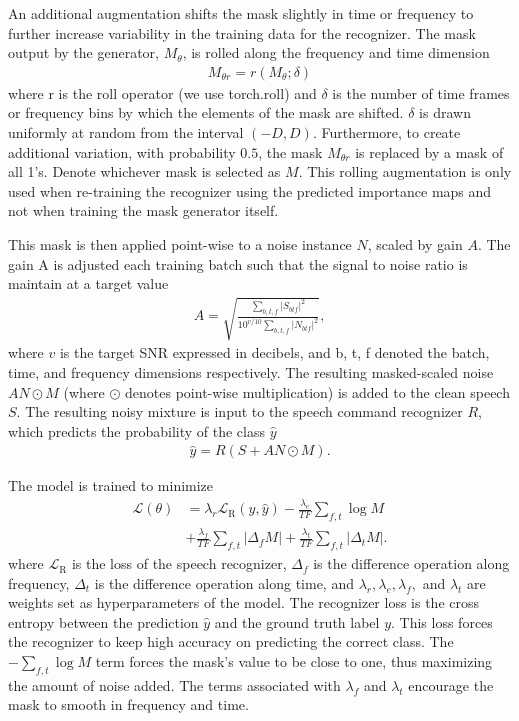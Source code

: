 \documentclass{article}
\begin{document}
An additional augmentation shifts the mask slightly in time or frequency to further increase variability in the training data for the recognizer. The mask output by the generator, $M_{\theta}$, is rolled along the frequency and time dimension 
\begin{align}
M_{\theta r} = r(M_{\theta};\delta)
\end{align}
where r is the roll operator (we use torch.roll) and $\delta$ is the number of time frames or frequency bins by which the elements of the mask are shifted. $\delta$ is drawn uniformly at random from the interval $(-D,D)$. 
Furthermore, to create additional variation, with probability $0.5$, the mask $M_{\theta r}$ is replaced by a mask of all 1's. Denote whichever mask is selected as $M$.
This rolling augmentation is only used when re-training the recognizer using the predicted importance maps and not when training the mask generator itself.



This mask is then applied point-wise to a noise instance $N$, scaled by gain $A$. 
The gain A is adjusted each training batch such that the signal to noise ratio is maintain at a target value
\begin{align}
A=\sqrt{\frac{\sum_{b,t,f}|S_{btf}|^2}{10^{v/10} \sum_{b,t,f} |N_{btf}|^2 }},
\end{align}
where $v$ is the target SNR expressed in decibels, and b, t, f denoted the batch, time, and frequency dimensions respectively. The resulting masked-scaled noise $A N \odot M$ (where $\odot$ denotes point-wise multiplication) is added to the clean speech $S$. The resulting noisy mixture is input to the speech command recognizer $R$, which predicts the probability of the class $\hat{y}$
\begin{align}
    \hat{y} = R(S + A N \odot M).
\end{align}




The model is trained to minimize
\begin{align}
  \mathcal{L}(\theta) &= \lambda_r \mathcal{L}_{\textrm{R}}(y, \hat{y}) 
  - \frac{\lambda_e}{TF}\sum_{f,t} \log M \nonumber \\ 
  &+ \frac{\lambda_f}{TF}\sum_{f,t} |\Delta_f M| 
  + \frac{\lambda_t}{TF}\sum_{f,t} |\Delta_t M|. \label{eq:bcnLoss}
\end{align}
where $\mathcal{L}_{\textrm{R}}$ is the loss of the speech recognizer, $\Delta_f$ is the difference operation along frequency, $\Delta_t$ is the difference operation along time, and $\lambda_r, \lambda_e, \lambda_f,$ and $\lambda_t$ are weights set as hyperparameters of the model. The recognizer loss is the cross entropy between the prediction $\hat{y}$ and the ground truth label $y$. This loss forces the recognizer to keep high accuracy on predicting the correct class. The $-\sum_{f,t} \log M$ term forces the mask's value to be close to one, thus maximizing the amount of noise added. The terms associated with $\lambda_f$ and $\lambda_t$ encourage the mask to smooth in frequency and time. 
\end{document}
